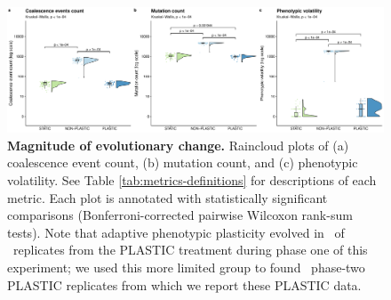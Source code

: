 
\begin{figure}[h!]
    \centering
    \includegraphics[width=1\textwidth]{media-evolutionary-change-magnitude-panel.pdf}
    \caption{\small
    \textbf{Magnitude of evolutionary change.}
    Raincloud plots \citep{allen_raincloud_2019} of
    (a) coalescence event count,
    (b) mutation count,
    and (c) phenotypic volatility.
    See Table \ref{tab:metrics-definitions} for descriptions of each metric.
    Each plot is annotated with statistically significant comparisons (Bonferroni-corrected pairwise Wilcoxon rank-sum tests).
    Note that adaptive phenotypic plasticity evolved in \evolutionaryChangeRatePlasticReps\ of \evolutionaryChangeRateReplicates\ replicates from the PLASTIC treatment during phase one of this experiment; we used this more limited group to found \evolutionaryChangeRatePlasticReps\ phase-two PLASTIC replicates from which we report these PLASTIC data.
    }
    \label{fig:evolutionary-dynamics-magnitude}
\end{figure}